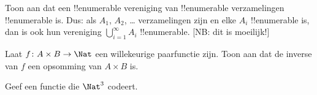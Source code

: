 \documentclass[openany]{memoir}
\begin{document}
\begin{prob}
Toon aan dat een !!{enumerable} vereniging van !!{enumerable}
verzamelingen !!{enumerable} is. Dus: als $A_1$, $A_2$, \dots{}
verzamelingen zijn en elke $A_i$ !!{enumerable} is, dan is ook hun
vereniging $\bigcup_{i=1}^\infty A_i$ !!{enumerable}. [NB: dit is
moeilijk!]
\end{prob}

\begin{prob}
Laat $f \colon A \times B \to \Nat$ een willekeurige paarfunctie zijn.
Toon aan dat de inverse van $f$ een opsomming van $A \times B$ is.
\end{prob}

\begin{prob}
Geef een functie die $\Nat^3$ codeert.
\end{prob}
\endgroup

\begingroup
\def\olfilename{OLP-0032}
\def\olfilepath{content/sets-functions-relations/size-of-sets/}
\hypertarget{unit-OLP-0032}{}




\end{document}
